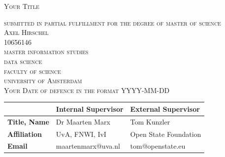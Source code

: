 \begin{titlepage}


\begin{center}
 
\textsc{\Large   Your Title }

\bigskip

\textsc{\large
submitted in partial fulfillment for the degree of master of science\\
%
\bigskip
Axel Hirschel\\
%
10656146\\
%
\bigskip
master information studies\\
%
data science \\
%
faculty of science\\
%
university of Amsterdam\\
%
\bigskip
Your Date of defence in the format YYYY-MM-DD
}

\end{center}
 

\vfill

\begin{center}
\begin{tabular}{|l||ll|}
\hline
 & \textbf{Internal  Supervisor} & \textbf{External   Supervisor}  \\   
 \hline
\textbf{Title, Name} & Dr Maarten Marx& Tom Kunzler  \\
\textbf{Affiliation} &UvA, FNWI, IvI & Open State Foundation \\ 
\textbf{Email} & maartenmarx@uva.nl&tom@openstate.eu \\
\hline
\end{tabular}
\end{center}


\bigskip


\end{titlepage}
